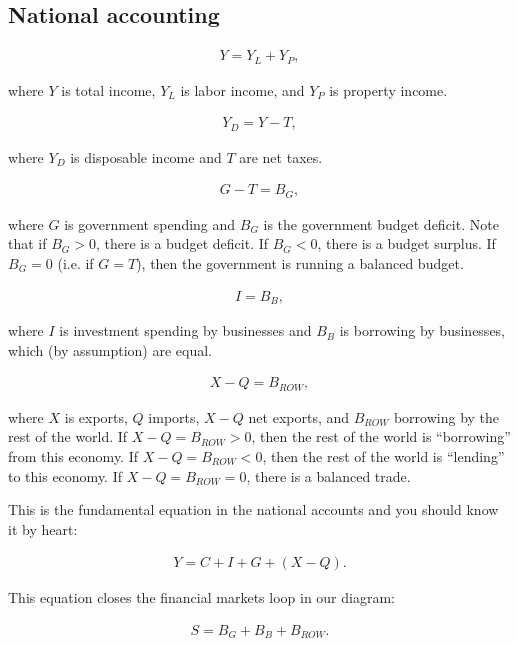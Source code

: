 \documentclass[12pt]{article}
\begin{document}
\subsection*{National accounting}

\begin{eqnarray} Y = Y_L + Y_P, \end{eqnarray}

\noindent where $Y$ is total income, $Y_L$ is labor income, and $Y_P$ is property income.

\begin{eqnarray} Y_D = Y - T, \end{eqnarray}

\noindent where $Y_D$ is disposable income and $T$ are net taxes.

\begin{eqnarray} G - T = B_G,\end{eqnarray}

\noindent where $G$ is government spending and $B_G$ is the government budget deficit.  Note that if $B_G > 0$, there is a budget deficit.  If $B_G < 0$, there is a budget surplus.  If $B_G = 0$ (i.e. if $G = T$), then the government is running a balanced budget.

\begin{eqnarray} I = B_B, \end{eqnarray}

\noindent where $I$ is investment spending by businesses and $B_B$ is borrowing by businesses, which (by assumption) are equal.

\begin{eqnarray} X-Q = B_{ROW}, \end{eqnarray}

\noindent where $X$ is exports, $Q$ imports, $X-Q$ net exports, and $B_{ROW}$ borrowing by the rest of the world.  If $X-Q = B_{ROW} > 0$, then the rest of the world is ``borrowing'' from this economy.  If  $X-Q = B_{ROW} < 0$, then the rest of the world is ``lending'' to this economy.  If $X-Q = B_{ROW} = 0$, there is a balanced trade.

This is the fundamental equation in the national accounts and you should know it by heart:

\begin{eqnarray} Y = C + I + G + (X-Q).\end{eqnarray}

This equation closes the financial markets loop in our diagram:

\begin{eqnarray} S = B_G + B_B + B_{ROW}.\end{eqnarray}
\end{document}
